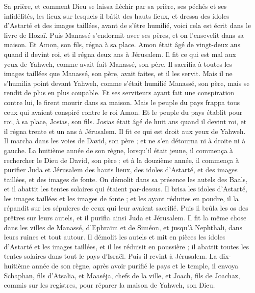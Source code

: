 \begin{multicols}{2}
Sa prière, et comment Dieu se laissa fléchir par sa prière, ses péchés et ses infidélités, les lieux sur lesquels il bâtit des hauts lieux, et dressa des idoles d'Astarté et des images taillées, avant de s'être humilié, voici cela est écrit dans le livre de Hozaï.
Puis Manassé s'endormit avec ses pères, et on l'ensevelit dans sa maison. Et Amon, son fils, régna à sa place.
Amon était âgé de vingt-deux ans quand il devint roi, et il régna deux ans à Jérusalem.
Il fit ce qui est mal aux yeux de Yahweh, comme avait fait Manassé, son père. Il sacrifia à toutes les images taillées que Manassé, son père, avait faites, et il les servit.
Mais il ne s'humilia point devant Yahweh, comme s'était humilié Manassé, son père, mais se rendit de plus en plus coupable.
Et ses serviteurs ayant fait une conspiration contre lui, le firent mourir dans sa maison.
Mais le peuple du pays frappa tous ceux qui avaient conspiré contre le roi Amon. Et le peuple du pays établit pour roi, à sa place, Josias, son fils.
\VerseOne{}Josias était âgé de huit ans quand il devint roi, et il régna trente et un ans à Jérusalem.
Il fit ce qui est droit aux yeux de Yahweh. Il marcha dans les voies de David, son père ; et ne s'en détourna ni à droite ni à gauche.
La huitième année de son règne, lorsqu'il était jeune, il commença à rechercher le Dieu de David, son père ; et à la douzième année, il commença à purifier Juda et Jérusalem des hauts lieux, des idoles d'Astarté, et des images taillées, et des images de fonte.
On démolit dans sa présence les autels des Baals, et il abattit les tentes solaires qui étaient par-dessus. Il brisa les idoles d'Astarté, les images taillées et les images de fonte ; et les ayant réduites en poudre, il la répandit sur les sépulcres de ceux qui leur avaient sacrifié.
Puis il brûla les os des prêtres sur leurs autels, et il purifia ainsi Juda et Jérusalem.
Il fit la même chose dans les villes de Manassé, d'Ephraïm et de Siméon, et jusqu'à Nephthali, dans leurs ruines et tout autour.
Il démolit les autels et mit en pièces les idoles d'Astarté et les images taillées, et il les réduisit en poussière ; il abattit toutes les tentes solaires dans tout le pays d'Israël. Puis il revint à Jérusalem.
La dix-huitième année de son règne, après avoir purifié le pays et le temple, il envoya Schaphan, fils d'Atsalia, et Maaséja, chefs de la ville, et Joach, fils de Joachaz, commis sur les registres, pour réparer la maison de Yahweh, son Dieu.

\end{multicols}
